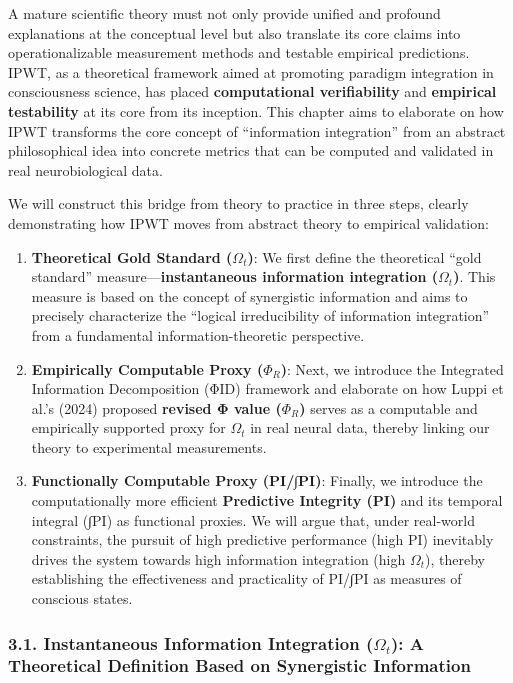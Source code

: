 \documentclass[
  a4paper]{article}
\providecommand{\tightlist}{%
  \setlength{\itemsep}{0pt}\setlength{\parskip}{0pt}}
\begin{document}
A mature scientific theory must not only provide unified and profound
explanations at the conceptual level but also translate its core claims
into operationalizable measurement methods and testable empirical
predictions. IPWT, as a theoretical framework aimed at promoting
paradigm integration in consciousness science, has placed
\textbf{computational verifiability} and \textbf{empirical testability}
at its core from its inception. This chapter aims to elaborate on how
IPWT transforms the core concept of ``information integration'' from an
abstract philosophical idea into concrete metrics that can be computed
and validated in real neurobiological data.

We will construct this bridge from theory to practice in three steps,
clearly demonstrating how IPWT moves from abstract theory to empirical
validation:

\begin{enumerate}
\def\labelenumi{\arabic{enumi}.}
\tightlist
\item
  \textbf{Theoretical Gold Standard (\(\Omega_t\))}: We first define the
  theoretical ``gold standard'' measure---\textbf{instantaneous
  information integration (\(\Omega_t\))}. This measure is based on the
  concept of synergistic information and aims to precisely characterize
  the ``logical irreducibility of information integration'' from a
  fundamental information-theoretic perspective.
\item
  \textbf{Empirically Computable Proxy (\(\Phi_R\))}: Next, we introduce
  the Integrated Information Decomposition (ΦID) framework and elaborate
  on how Luppi et al.'s (2024) proposed \textbf{revised Φ value
  (\(\Phi_R\))} serves as a computable and empirically supported proxy
  for \(\Omega_t\) in real neural data, thereby linking our theory to
  experimental measurements.
\item
  \textbf{Functionally Computable Proxy (PI/∫PI)}: Finally, we introduce
  the computationally more efficient \textbf{Predictive Integrity (PI)}
  and its temporal integral (∫PI) as functional proxies. We will argue
  that, under real-world constraints, the pursuit of high predictive
  performance (high PI) inevitably drives the system towards high
  information integration (high \(\Omega_t\)), thereby establishing the
  effectiveness and practicality of PI/∫PI as measures of conscious
  states.
\end{enumerate}

\subsubsection{\texorpdfstring{3.1. Instantaneous Information
Integration (\(\Omega_t\)): A Theoretical Definition Based on
Synergistic
Information}{3.1. Instantaneous Information Integration (\textbackslash Omega\_t): A Theoretical Definition Based on Synergistic Information}}\label{instantaneous-information-integration-omega_t-a-theoretical-definition-based-on-synergistic-information}
\end{document}
